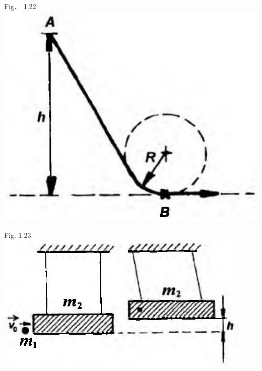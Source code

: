 \documentclass[10pt]{article}
\begin{document}
Fig． 1.22\\
\includegraphics[max width=\textwidth, center]{2025_07_01_5b3ff9fa0d508c8e9f17g-058(1)}

Fig. 1.23\\
\includegraphics[max width=\textwidth, center]{2025_07_01_5b3ff9fa0d508c8e9f17g-058}
\end{document}
